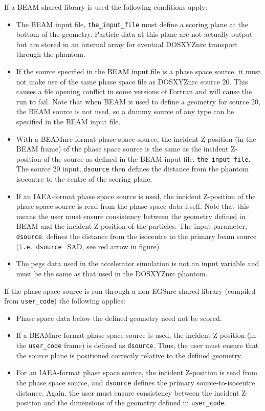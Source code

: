 \documentclass[12pt,twoside]{article}      %
\begin{document}
If a BEAM shared library is used the following conditions apply:
\begin{itemize}
\item The BEAM input file, {\tt the\_input\_file} must define a scoring plane at the bottom of the geometry.  Particle data
at this plane are not actually output but are stored in an internal array for eventual DOSXYZnrc transport through the
phantom.
\item If the source specified in the BEAM input file is a phase space source, it must not make use of the same phase space file as DOSXYZnrc source 20.  This causes a file opening conflict in some versions of
Fortran and will cause the run to fail.  Note that when BEAM is used to define a geometry
for source 20, the BEAM source is not used, so a dummy source of any type can be specified in the BEAM input
file.
\item With a BEAMnrc-format phase space source, the incident Z-position (in the BEAM frame) of the phase space source is
the same as the incident Z-position of the source as defined in the BEAM input file, {\tt the\_input\_file}.  The source 20 input,
{\tt dsource} then defines the distance from the phantom isocentre to the centre of the scoring plane.
\item If an IAEA-format phase space source is used, the incident Z-position of the phase space source is read from
the phase space data itself.  Note that this means the user must ensure consistency between the geometry defined in
BEAM and the incident Z-position of the particles.  The input parameter, {\tt dsource}, defines the distance from
the isocentre to the primary beam source ({\tt i.e.} {\tt dsource}=SAD, see red arrow in figure)
\item The pegs data used in the accelerator simulation is not an input variable and must be the
same as that used in the DOSXYZnrc phantom.
\end{itemize}

If the phase space source is run through a non-EGSnrc shared library (compiled from {\tt user\_code})
the following applies:
\begin{itemize}
\item Phase space data below the defined geometry need not be scored.
\item If a BEAMnrc-format phase space source is used, the incident Z-position (in the {\tt user\_code} frame) is defined
as {\tt dsource}.  Thus, the user must ensure that the source plane is positioned correctly relative to the
defined geometry.
\item For an IAEA-format phase space source, the incident Z-position is read from the phase space source, and
{\tt dsource} defines the primary source-to-isocentre distance.  Again, the user must ensure consistency
between the incident Z-position and the dimensions of the geometry defined in {\tt user\_code}.
\end{itemize}
\end{document}
